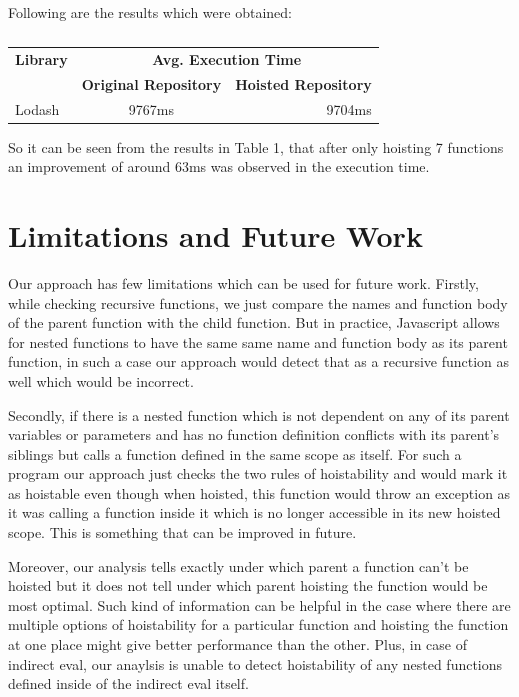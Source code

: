 \documentclass[authoryear,preprint]{sigplanconf}
\begin{document}
Following are the results which were obtained:
\begin{table}[h!]
  \begin{center}
    \caption{}
    \label{tab:evaluation}
    \begin{tabular}{l|c|r|} %
      \textbf{Library} & \multicolumn{2}{c|}{\textbf{Avg. Execution Time}}\\
      \textbf{} & \textbf{Original Repository} & \textbf{Hoisted Repository}\\
      \hline
      Lodash & 9767ms & 9704ms\\
    \end{tabular}
  \end{center}
\end{table}


So it can be seen from the results in Table 1, that after only hoisting 7 functions an improvement of around 63ms was observed in the execution time.

\section{Limitations and Future Work}
\label{sec:limitation}
Our approach has few limitations which can be used for future work. Firstly, while checking recursive functions, we just compare the names and function body of the parent function with the child function. But in practice, Javascript allows for nested functions to have the same same name and function body as its parent function, in such a case our approach would detect that as a recursive function as well which would be incorrect. \par

Secondly, if there is a nested function which is not dependent on any of its parent variables or parameters and has no function definition conflicts with its parent's siblings but calls a function defined in the same scope as itself. For such a program our approach just checks the two rules of hoistability and would mark it as hoistable even though when hoisted, this function would throw an exception as it was calling a function inside it which is no longer accessible in its new hoisted scope. This is something that can be improved in future. \par

Moreover, our analysis tells exactly under which parent a function can't be hoisted but it does not tell under which parent hoisting the function would be most optimal. Such kind of information can be helpful in the case where there are multiple options of hoistability for a particular function and hoisting the function at one place might give better performance than the other. Plus, in case of indirect eval, our anaylsis is unable to detect hoistability of any nested functions defined inside of the indirect eval itself. 
\end{document}
